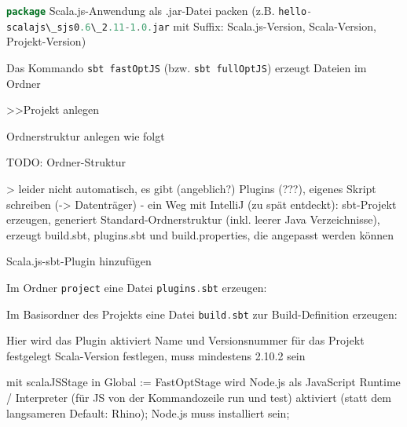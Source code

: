 \documentclass[a4paper, 12pt, hidelinks, listof=totoc, listoftables=totoc, bibliography=totoc]{scrreprt}
\newcommand{\code}[1]{\lstinline[language=Scala, style=inline]|#1|}
\begin{document}
\code{package} Scala.js-Anwendung als .jar-Datei packen (z.B. \code{hello-scalajs\_sjs0.6\_2.11-1.0.jar} mit Suffix: Scala.js-Version, Scala-Version, Projekt-Version)






Das Kommando \code{sbt fastOptJS} (bzw. \code{sbt fullOptJS}) erzeugt Dateien im Ordner
















>>Projekt anlegen


Ordnerstruktur anlegen wie folgt

TODO: Ordner-Struktur

> leider nicht automatisch, es gibt (angeblich?) Plugins (???), eigenes Skript schreiben (-> Datenträger)
	- ein Weg mit IntelliJ (zu spät entdeckt): sbt-Projekt erzeugen, generiert Standard-Ordnerstruktur (inkl. leerer Java Verzeichnisse), erzeugt build.sbt, plugins.sbt und build.properties, die angepasst werden können


Scala.js-sbt-Plugin hinzufügen

Im Ordner \code{project} eine Datei \code{plugins.sbt} erzeugen:


Im Basisordner des Projekts eine Datei \code{build.sbt} zur Build-Definition erzeugen:


Hier wird das Plugin aktiviert
Name und Versionsnummer für das Projekt festgelegt
Scala-Version festlegen, muss mindestens 2.10.2 sein

mit scalaJSStage in Global := FastOptStage wird Node.js als JavaScript Runtime / Interpreter (für JS von der Kommandozeile run und test) aktiviert (statt dem langsameren Default: Rhino); Node.js muss installiert sein;
\end{document}

